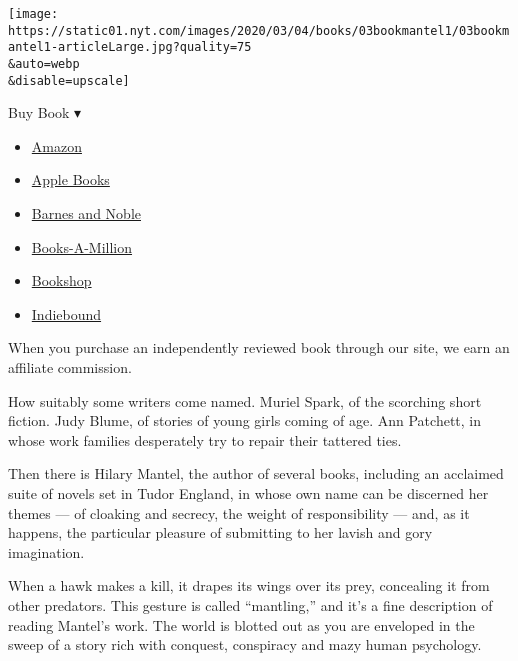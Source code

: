\texttt{[image: https://static01.nyt.com/images/2020/03/04/books/03bookmantel1/03bookmantel1-articleLarge.jpg?quality=75\\\&auto=webp\\\&disable=upscale]}

Buy Book ▾

\begin{itemize}
\tightlist
\item
  \href{https://www.amazon.com/gp/search?index=books\&tag=NYTBSREV-20\&field-keywords=The+Mirror+and+the+Light+Hilary+Mantel}{Amazon}
\item
  \href{https://du-gae-books-dot-nyt-du-prd.appspot.com/buy?title=The+Mirror+and+the+Light\&author=Hilary+Mantel}{Apple
  Books}
\item
  \href{https://www.anrdoezrs.net/click-7990613-11819508?url=https\%3A\%2F\%2Fwww.barnesandnoble.com\%2Fw\%2F\%3Fean\%3D9780805096606}{Barnes
  and Noble}
\item
  \href{https://www.anrdoezrs.net/click-7990613-35140?url=https\%3A\%2F\%2Fwww.booksamillion.com\%2Fp\%2FThe\%2BMirror\%2Band\%2Bthe\%2BLight\%2FHilary\%2BMantel\%2F9780805096606}{Books-A-Million}
\item
  \href{https://bookshop.org/a/3546/9780805096606}{Bookshop}
\item
  \href{https://www.indiebound.org/book/9780805096606?aff=NYT}{Indiebound}
\end{itemize}

When you purchase an independently reviewed book through our site, we
earn an affiliate commission.

How suitably some writers come named. Muriel Spark, of the scorching
short fiction. Judy Blume, of stories of young girls coming of age. Ann
Patchett, in whose work families desperately try to repair their
tattered ties.

Then there is Hilary Mantel, the author of several books, including an
acclaimed suite of novels set in Tudor England, in whose own name can be
discerned her themes --- of cloaking and secrecy, the weight of
responsibility --- and, as it happens, the particular pleasure of
submitting to her lavish and gory imagination.

When a hawk makes a kill, it drapes its wings over its prey, concealing
it from other predators. This gesture is called ``mantling,'' and it's a
fine description of reading Mantel's work. The world is blotted out as
you are enveloped in the sweep of a story rich with conquest, conspiracy
and mazy human psychology.

